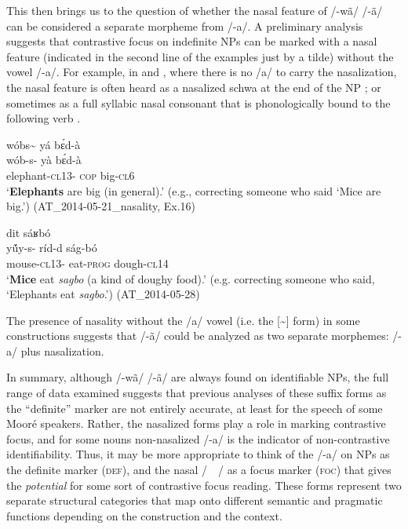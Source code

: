 \documentclass[output=paper]{langsci/langscibook}
\begin{document}
This then brings us to the question of whether the nasal feature of /-wã/ {\Tilde} /-ã/ can be considered a separate morpheme from /-a/. A preliminary analysis suggests that contrastive focus on indefinite NPs can be marked with a nasal feature (indicated in the second line of the examples just by a tilde) without the vowel /-a/. For example, in  and , where there is no /a/ to carry the nasalization, the nasal feature is often heard as a nasalized schwa at the end of the NP ; or sometimes as a full syllabic nasal consonant that is phonologically bound to the following verb .
 
\ea\label{ex:teo:55}
\glll w\'{o}bs\~{\textschwa} yá b\'ɛd-à\\
wób-s-\textsuperscript{{\Tilde}}  yà b\'ɛd-à\\
elephant-\textsc{cl13}-\textsuperscript{{\Tilde}}  \textsc{cop} big-\textsc{cl6}\\
\glt ‘\textbf{Elephants} are big (in general).’ (e.g., correcting someone who said ‘Mice are big.’) (AT\_2014-05-21\_nasality, Ex.16)
\z
 
\ea\label{ex:teo:56}
 dit sáʁbó\\
y\'ũy-s-\textsuperscript{{\Tilde}}  ríd-d{\rmfnm} ság-bó\\
mouse-\textsc{cl}13-\textsuperscript{{\Tilde}} eat-\textsc{prog} dough-\textsc{cl14} \\
\glt ‘\textbf{Mice} eat \textit{sagbo} (a kind of doughy food).’ (e.g. correcting someone who said, ‘Elephants eat \textit{sagbo}.’) (AT\_2014-05-28)
\z
{}

The presence of nasality without the /a/ vowel (i.e. the [\~{\schwa}] form) in some constructions suggests that /-ã/ could be analyzed as two separate morphemes: /-a/ plus nasalization.


In summary, although /-wã/ {\Tilde} /-ã/ are always found on identifiable NPs, the full range of data examined suggests that previous analyses of these suffix forms as the “definite” marker are not entirely accurate, at least for the speech of some Mooré speakers. Rather, the nasalized forms play a role in marking contrastive focus, and for some nouns non-nasalized /-a/ is the indicator of non-contrastive identifiability. Thus, it may be more appropriate to think of the /-a/ on NPs as the definite marker (\textsc{def}), and the nasal /~\textsuperscript{\Tilde}~/ as a focus marker (\textsc{foc}) that gives the \textit{potential} for some sort of contrastive focus reading. These forms represent two separate structural categories that map onto different semantic and pragmatic functions depending on the construction and the context.
\end{document}
